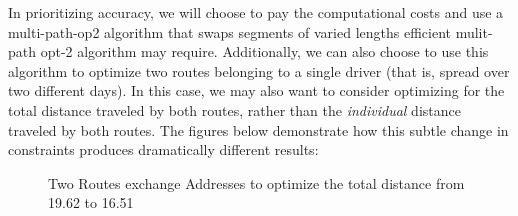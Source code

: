 \documentclass[letterpaper]{article}
\begin{document}
    In prioritizing accuracy, we will choose to pay the computational costs and use a multi-path-op2 algorithm that swaps segments of varied lengths efficient mulit-path opt-2 algorithm may require. Additionally, we can also choose to use this algorithm to optimize two routes belonging to a single driver (that is, spread over two different days). In this case, we may also want to consider optimizing for the total distance traveled by both routes, rather than the \emph{individual} distance traveled by both routes. The figures below demonstrate how this subtle change in constraints produces dramatically different results:
    \begin{figure}[h]
        \caption{Two Routes exchange Addresses to optimize the total distance from 19.62 to 16.51}
        \label{figure:swap_1}
        \begin{minipage}{0.45\linewidth}
        \end{minipage}
        \begin{minipage}{0.45\linewidth}
\end{minipage}
\end{figure}
\end{document}

